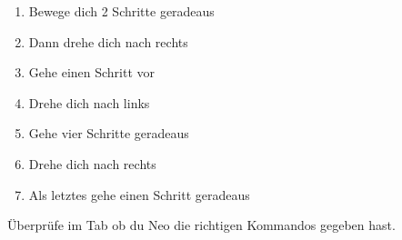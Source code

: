 \begin{enumerate}
        {
            \begin{enumerate}
                \item Bewege dich 2 Schritte geradeaus
                \item Dann drehe dich nach rechts
                \item Gehe einen Schritt vor
                \item Drehe dich nach links
                \item Gehe vier Schritte geradeaus
                \item Drehe dich nach rechts
                \item Als letztes gehe einen Schritt geradeaus
            \end{enumerate}
        }

        Überprüfe im  Tab ob du Neo die richtigen Kommandos gegeben hast.
\end{enumerate}


